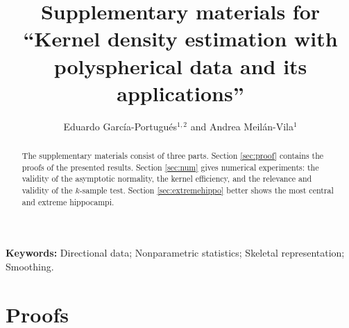 \documentclass[oneside,11pt]{article}
\newif\ifsupplement
\begin{document}
\fi

\ifsupplement

\newpage
\title{Supplementary materials for ``Kernel density estimation with polyspherical data and its applications''}
\setlength{\droptitle}{-1cm}
\predate{}%
\postdate{}%
\date{}

\author{Eduardo Garc\'ia-Portugu\'es$^{1,2}$ and Andrea Meil\'an-Vila$^{1}$}
\maketitle

\begin{abstract}
The supplementary materials consist of three parts. Section \ref{sec:proof} contains the proofs of the presented results. Section \ref{sec:num} gives numerical experiments: the validity of the asymptotic normality, the kernel efficiency, and the relevance and validity of the $k$-sample test. Section \ref{sec:extremehippo} better shows the most central and extreme hippocampi.
\end{abstract}
\begin{flushleft}
	\small\textbf{Keywords:} Directional data; Nonparametric statistics; Skeletal representation; Smoothing.
\end{flushleft}

\appendix

\section{Proofs}
\label{sec:proof}
\end{document}
